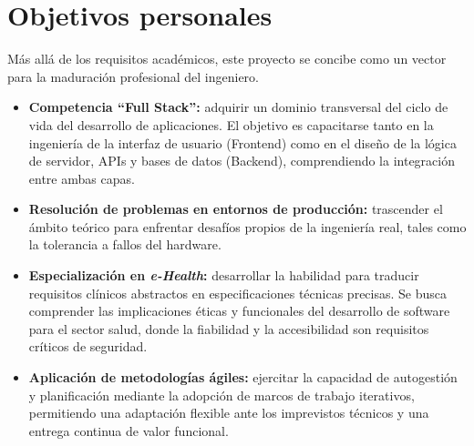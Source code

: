 \section{Objetivos personales}

Más allá de los requisitos académicos, este proyecto se concibe como un vector para la maduración profesional del ingeniero.

\begin{itemize}
    \item \textbf{Competencia ``Full Stack'':} adquirir un dominio transversal del ciclo de vida del desarrollo de aplicaciones. El objetivo es capacitarse tanto en la ingeniería de la interfaz de usuario (Frontend) como en el diseño de la lógica de servidor, APIs y bases de datos (Backend), comprendiendo la integración entre ambas capas.

    \item \textbf{Resolución de problemas en entornos de producción:} trascender el ámbito teórico para enfrentar desafíos propios de la ingeniería real, tales como la tolerancia a fallos del hardware.

    \item \textbf{Especialización en \textit{e-Health}:} desarrollar la habilidad para traducir requisitos clínicos abstractos en especificaciones técnicas precisas. Se busca comprender las implicaciones éticas y funcionales del desarrollo de software para el sector salud, donde la fiabilidad y la accesibilidad son requisitos críticos de seguridad.

    \item \textbf{Aplicación de metodologías ágiles:} ejercitar la capacidad de autogestión y planificación mediante la adopción de marcos de trabajo iterativos, permitiendo una adaptación flexible ante los imprevistos técnicos y una entrega continua de valor funcional.
\end{itemize}